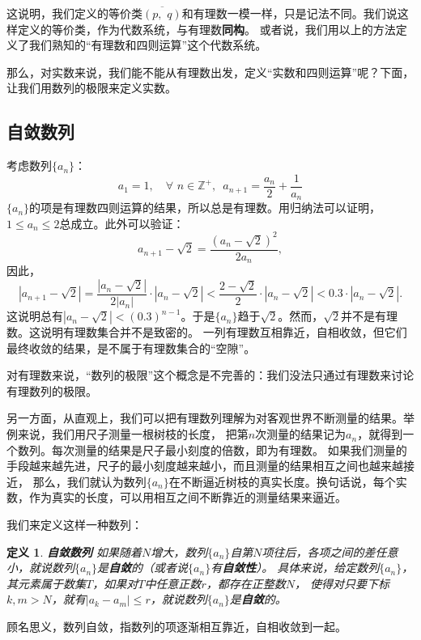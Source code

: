 \documentclass[12pt,UTF8]{ctexbook}
\newtheorem{df}{定义}[section]
\begin{document}
这说明，我们定义的等价类$\overline{(p,\,\, q)}$和有理数一模一样，只是记法不同。我们说这样定义的等价类，作为代数系统，与有理数\textbf{同构}。
或者说，我们用以上的方法定义了我们熟知的“有理数和四则运算”这个代数系统。

那么，对实数来说，我们能不能从有理数出发，定义“实数和四则运算”呢？下面，让我们用数列的极限来定义实数。

\subsection{自敛数列}

考虑数列$\{a_n\}$：
$$ a_1 = 1, \quad \forall \,\, n \in \mathbb{Z}^+, \,\,\, a_{n+1} = \frac{a_n}{2} + \frac{1}{a_n} $$
$\{a_n\}$的项是有理数四则运算的结果，所以总是有理数。用归纳法可以证明，$1 \leqslant a_n \leqslant 2$总成立。此外可以验证：
$$ a_{n+1} - \sqrt{2} = \frac{(a_n - \sqrt{2})^2}{2a_n},$$
因此，
$$ |a_{n+1} - \sqrt{2}| = \frac{|a_n - \sqrt{2}|}{2|a_n|} \cdot |a_n - \sqrt{2}| < \frac{2 - \sqrt{2}}{2} \cdot |a_n - \sqrt{2}| < 0.3\cdot |a_n - \sqrt{2}|. $$
这说明总有$|a_n - \sqrt{2}| < (0.3)^{n-1}$。于是$\{a_n\}$趋于$\sqrt{2}$。然而，$\sqrt{2}$并不是有理数。这说明有理数集合并不是致密的。
一列有理数互相靠近，自相收敛，但它们最终收敛的结果，是不属于有理数集合的“空隙”。

对有理数来说，“数列的极限”这个概念是不完善的：我们没法只通过有理数来讨论有理数列的极限。

另一方面，从直观上，我们可以把有理数列理解为对客观世界不断测量的结果。举例来说，我们用尺子测量一根树枝的长度，
把第$n$次测量的结果记为$a_n$，就得到一个数列。每次测量的结果是尺子最小刻度的倍数，即为有理数。
如果我们测量的手段越来越先进，尺子的最小刻度越来越小，而且测量的结果相互之间也越来越接近，
那么，我们就认为数列$\{a_n\}$在不断逼近树枝的真实长度。换句话说，每个实数，作为真实的长度，可以用相互之间不断靠近的测量结果来逼近。

我们来定义这样一种数列：
\begin{df}\textbf{自敛数列}
    如果随着$N$增大，数列$\{a_n\}$自第$N$项往后，各项之间的差任意小，就说数列$\{a_n\}$是\textbf{自敛}的（或者说$\{a_n\}$有\textbf{自敛性}）。
    具体来说，给定数列$\{a_n\}$，其元素属于数集$T$，如果对$T$中任意正数$r$，都存在正整数$N$，
    使得对只要下标$k,m>N$，就有$|a_k - a_m| \leqslant r$，就说数列$\{a_n\}$是\textbf{自敛}的。
\end{df}

顾名思义，数列自敛，指数列的项逐渐相互靠近，自相收敛到一起。
\end{document}
